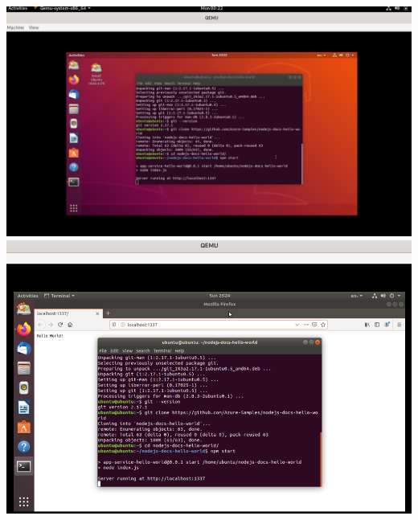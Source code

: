 \documentclass[12pt,vi]{mitthesis}
\begin{document}
\includegraphics[width=\linewidth]{images/ModulNodeJSUbuntuTerminal.png}\\
\includegraphics[width=\linewidth]{images/ModulNodeJSUbuntu1.png} 
\end{document}
